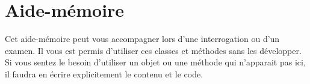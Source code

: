\chapter{Aide-mémoire}

Cet aide-mémoire peut vous accompagner lors d'une
interrogation ou d'un examen. Il vous est permis
d’utiliser ces classes et méthodes sans les développer.
Si vous sentez le besoin d’utiliser un objet ou une méthode qui
n'apparait pas ici, il faudra en écrire explicitement
le contenu et le code.





